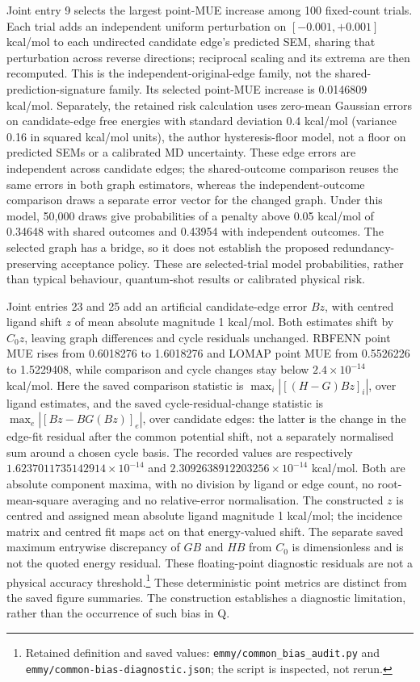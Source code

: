 \documentclass{article}
\begin{document}
Joint entry 9 selects the largest point-MUE increase among 100 fixed-count trials. Each trial adds an independent uniform perturbation on \([-0.001,+0.001]\) kcal/mol to each undirected candidate edge's predicted SEM, sharing that perturbation across reverse directions; reciprocal scaling and its extrema are then recomputed. This is the independent-original-edge family, not the shared-prediction-signature family. Its selected point-MUE increase is 0.0146809 kcal/mol. Separately, the retained risk calculation uses zero-mean Gaussian errors on candidate-edge free energies with standard deviation 0.4 kcal/mol (variance 0.16 in squared kcal/mol units), the author hysteresis-floor model, not a floor on predicted SEMs or a calibrated MD uncertainty. These edge errors are independent across candidate edges; the shared-outcome comparison reuses the same errors in both graph estimators, whereas the independent-outcome comparison draws a separate error vector for the changed graph. Under this model, 50,000 draws give probabilities of a penalty above 0.05 kcal/mol of 0.34648 with shared outcomes and 0.43954 with independent outcomes. The selected graph has a bridge, so it does not establish the proposed redundancy-preserving acceptance policy. These are selected-trial model probabilities, rather than typical behaviour, quantum-shot results or calibrated physical risk.

Joint entries 23 and 25 add an artificial candidate-edge error \(Bz\), with centred ligand shift \(z\) of mean absolute magnitude 1 kcal/mol. Both estimates shift by \(C_0z\), leaving graph differences and cycle residuals unchanged. RBFENN point MUE rises from 0.6018276 to 1.6018276 and LOMAP point MUE from 0.5526226 to 1.5229408, while comparison and cycle changes stay below \(2.4\times10^{-14}\) kcal/mol. Here the saved comparison statistic is \(\max_i|[(H-G)Bz]_i|\), over ligand estimates, and the saved cycle-residual-change statistic is \(\max_e|[Bz-BG(Bz)]_e|\), over candidate edges: the latter is the change in the edge-fit residual after the common potential shift, not a separately normalised sum around a chosen cycle basis. The recorded values are respectively \(1.6237011735142914\times10^{-14}\) and \(2.3092638912203256\times10^{-14}\) kcal/mol. Both are absolute component maxima, with no division by ligand or edge count, no root-mean-square averaging and no relative-error normalisation. The constructed \(z\) is centred and assigned mean absolute ligand magnitude 1 kcal/mol; the incidence matrix and centred fit maps act on that energy-valued shift. The separate saved maximum entrywise discrepancy of \(GB\) and \(HB\) from \(C_0\) is dimensionless and is not the quoted energy residual. These floating-point diagnostic residuals are not a physical accuracy threshold.\footnote{Retained definition and saved values: \texttt{emmy/common\_bias\_audit.py} and \texttt{emmy/common-bias-diagnostic.json}; the script is inspected, not rerun.} These deterministic point metrics are distinct from the saved figure summaries. The construction establishes a diagnostic limitation, rather than the occurrence of such bias in Q.
\end{document}
